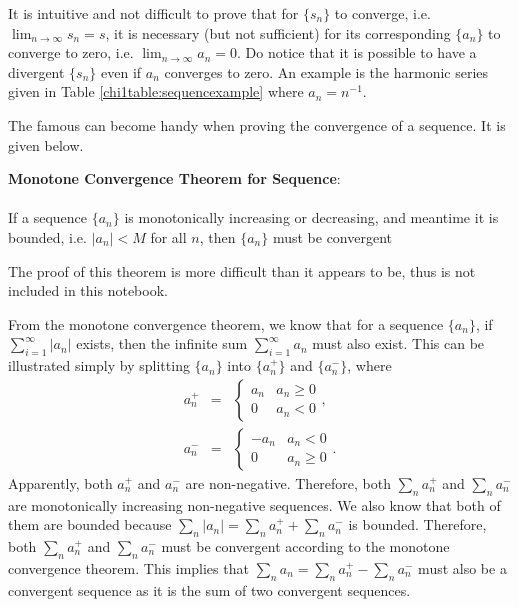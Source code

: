 It is intuitive and not difficult to prove that for $\{s_n\}$ to converge, i.e. $\lim_{n\rightarrow\infty}s_n = s$, it is necessary (but not sufficient) for its corresponding $\{a_n\}$ to converge to zero, i.e. $\lim_{n\rightarrow\infty}a_n = 0$. Do notice that it is possible to have a divergent $\{s_n\}$ even if $a_n$ converges to zero. An example is the harmonic series given in Table \ref{chi1table:sequencexample} where $a_n = n^{-1}$. 

The famous  can become handy when proving the convergence of a sequence. It is given below.
\begin{VF}
\textbf{Monotone Convergence Theorem for Sequence}:
\\
\\
\noindent If a sequence $\{a_n\}$ is monotonically increasing or decreasing, and meantime it is bounded, i.e. $|a_n| < M$ for all $n$, then $\{a_n\}$ must be convergent
\end{VF}
The proof of this theorem is more difficult than it appears to be, thus is not included in this notebook.

From the monotone convergence theorem, we know that for a sequence $\{a_n\}$, if $\sum_{i=1}^{\infty}|a_n|$ exists, then the infinite sum $\sum_{i=1}^{\infty}a_n$ must also exist. This can be illustrated simply by splitting $\{a_n\}$ into $\{a_n^+\}$ and $\{a_n^-\}$, where
\begin{eqnarray}
  a_n^+ &=& \left\{\begin{array}{cc}
                     a_n & a_n \geq 0 \\
                     0 & a_n < 0
                   \end{array}\right.,  \nonumber \\
  a_n^- &=& \left\{\begin{array}{cc}
                     -a_n & a_n < 0 \\
                     0 & a_n \geq 0
                   \end{array}\right.. \nonumber
\end{eqnarray}
Apparently, both $a_n^+$ and $a_n^-$ are non-negative. Therefore, both $\sum_na_n^+$ and $\sum_na_n^-$ are monotonically increasing non-negative sequences. We also know that both of them are bounded because $\sum_{n}|a_n| = \sum_{n}a_n^+ + \sum_{n}a_n^-$ is bounded. Therefore, both $\sum_na_n^+$ and $\sum_na_n^-$ must be convergent according to the monotone convergence theorem. This implies that $\sum_n a_n = \sum_n a_n^+ - \sum_n a_n^-$ must also be a convergent sequence as it is the sum of two convergent sequences.

